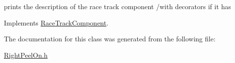 prints the description of the race track component /with decorators if it has 

Implements \mbox{\hyperlink{class_race_track_component_a02a8d9520cfd80f31dd94b5fa1e76d47}{Race\+Track\+Component}}.



The documentation for this class was generated from the following file\+:\begin{DoxyCompactItemize}
\item 
\mbox{\hyperlink{_right_peel_on_8h}{Right\+Peel\+On.\+h}}\end{DoxyCompactItemize}
